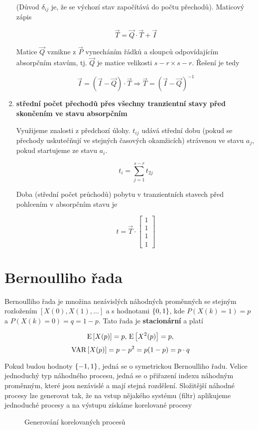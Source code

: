 \begin{enumerate}[label=\arabic*)]
	(Důvod $\delta_{ij}$ je, že se výchozí stav započítává do počtu přechodů). Maticový zápis
	
	\[ \vec{T} = \vec{Q}\cdot\vec{T}+\vec{I} \]
	
	Matice $\vec{Q}$ vznikne z $\vec{P}$ vynecháním řádků a sloupců odpovídajícím absorpčním stavům, tj. $\vec{Q}$ je matice velikosti $s-r\times s-r$. Řešení je tedy
	
	\[ \vec{I}=(\vec{I}-\vec{Q})\cdot\vec{T}\Rightarrow \vec{T}=(\vec{I}-\vec{Q})^{-1} \]

\item \textbf{střední počet přechodů přes všechny tranzientní stavy před skončením ve stavu absorpčním}\br

	Využijeme znalosti z předchozí úlohy. $t_{ij}$ udává střední dobu (pokud se přechody uskutečňují ve stejných časových okamžicích) strávenou ve stavu $a_j$, pokud startujeme ze stavu $a_i$.
	
	\[ t_i=\sum_{j=1}^{s-r}t_{2j} \]
	
	Doba (střední počet průchodů) pobytu v tranzientních stavech před pohlcením v absorpčním stavu je
	
	\[ t = \vec{T}\cdot
	\begin{bmatrix}
	1\\1\\1\\1
	\end{bmatrix}	 
	\]
\end{enumerate}

\section{Bernoulliho řada}
Bernoulliho řada je množina nezávislých náhodných proměnných se stejným rozložením $[X(0),X(1),\ldots]$ a s hodnotami $\left\{0,1\right\}$, kde $P(X(k)=1)=p$ a $P(X(k)=0)=q=1-p$. Tato řada je \textbf{stacionární} a platí

\[ \,\mathrm{E}\left[X(p)\right]=p,\,\mathrm{E}\left[X^2(p)\right]=p, \]
\[ \,\mathrm{VAR}\left[X(p)\right]=p-p^2=p(1-p)=p\cdot q  \]

Pokud budou hodnoty $\left\{-1,1\right\}$, jedná se o symetrickou Bernoulliho řadu. Velice jednoduchý typ náhodného procesu, jedná se o přiřazení indexu náhodným proměnným, které jsou nezávislé a mají stejná rozdělení. Složitější náhodné procesy lze generovat tak, že na vstup nějakého systému (filtr) aplikujeme jednoduché procesy a na výstupu získáme korelované procesy

\begin{figure}
\caption{Generování korelovaných procesů}
\end{figure}

